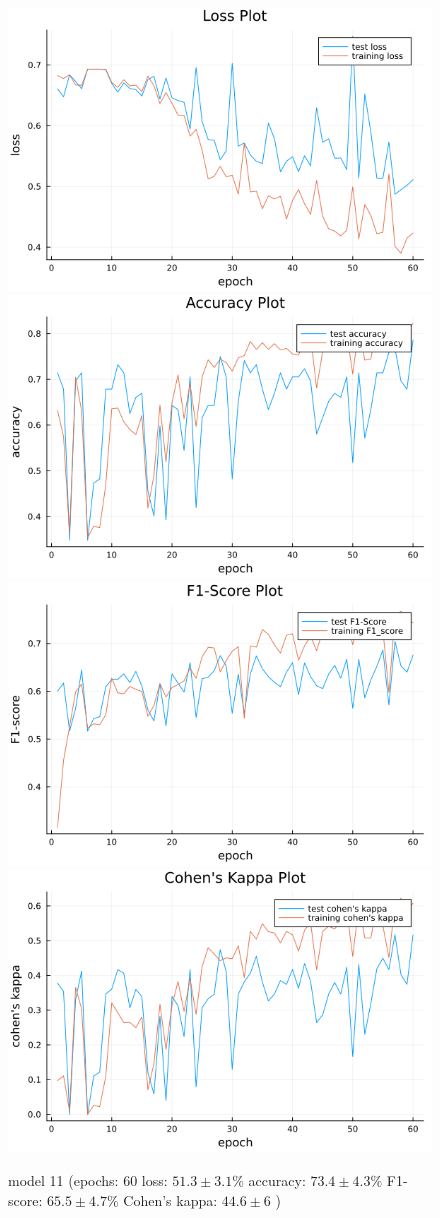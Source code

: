 \documentclass[
a4paper, 
12pt,
grayscalebody, %
abstract=on,
twoside, BCOR10mm, 12pt, DIV13,headinclude, footexclude, final, abstracton, openright
]{ibireprt}
\numberwithin{equation}{chapter}
\numberwithin{table}{chapter}
\numberwithin{figure}{chapter}
\numberwithin{algorithm}{chapter}
\numberwithin{example}{chapter}
\numberwithin{example}{chapter}
\begin{document}
\begin{figure}[h]
	\includegraphics[width=0.4\linewidth]{loss_png_13_1.png}\hfill
	\includegraphics[width=0.4\linewidth]{accuracy_png_13_1.png}
	\\[\smallskipamount]
	\includegraphics[width=0.4\linewidth]{f1_score_png_13_1.png}\hfill
	\includegraphics[width=0.4\linewidth]{cohens_kappa_png_13_1.png}
	\caption{model 11 (epochs: 60 loss: $51.3\pm3.1\% $ accuracy: $73.4\pm4.3\%$ F1-score: $65.5\pm4.7\%$  Cohen's kappa: $44.6\pm6$ )}
	\label{fig:model_11_60}
\end{figure}

\end{document}
